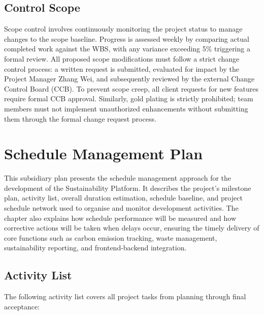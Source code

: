 \documentclass[12pt,a4paper]{article}
\begin{document}
\subsection{Control Scope}
Scope control involves continuously monitoring the project status to manage changes to the scope baseline. Progress is assessed weekly by comparing actual completed work against the WBS, with any variance exceeding 5\% triggering a formal review. All proposed scope modifications must follow a strict change control process: a written request is submitted, evaluated for impact by the Project Manager Zhang Wei, and subsequently reviewed by the external Change Control Board (CCB). To prevent scope creep, all client requests for new features require formal CCB approval. Similarly, gold plating is strictly prohibited; team members must not implement unauthorized enhancements without submitting them through the formal change request process.

\clearpage
\section{Schedule Management Plan}


This subsidiary plan presents the schedule management approach for the development of the Sustainability Platform. It describes the project’s milestone plan, activity list, overall duration estimation, schedule baseline, and project schedule network used to organise and monitor development activities. The chapter also explains how schedule performance will be measured and how corrective actions will be taken when delays occur, ensuring the timely delivery of core functions such as carbon emission tracking, waste management, sustainability reporting, and frontend-backend integration.


\subsection{Activity List}

The following activity list covers all project tasks from planning through final acceptance:
\end{document}
